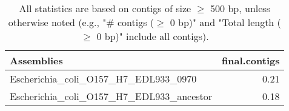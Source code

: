 \documentclass[12pt,a4paper]{article}
\begin{document}
\begin{table}[ht]
\begin{center}
\caption{All statistics are based on contigs of size $\geq$ 500 bp, unless otherwise noted (e.g., "\# contigs ($\geq$ 0 bp)" and "Total length ($\geq$ 0 bp)" include all contigs).}
\begin{tabular}{|l*{1}{|r}|}
\hline
Assemblies & final.contigs \\ \hline
Escherichia\_coli\_O157\_H7\_EDL933\_0970 & 0.21 \\ \hline
Escherichia\_coli\_O157\_H7\_EDL933\_ancestor & 0.18 \\ \hline
\end{tabular}
\end{center}
\end{table}
\end{document}
